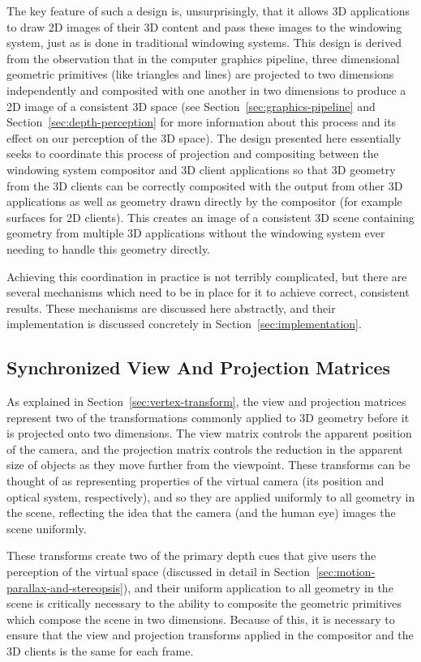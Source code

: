 The key feature of such a design is, unsurprisingly, that it allows 3D applications to draw 2D images of their 3D content and pass these images to the windowing system, just as is done in traditional windowing systems. This design is derived from the observation that in the computer graphics pipeline, three dimensional geometric primitives (like triangles and lines) are projected to two dimensions independently and composited with one another in two dimensions to produce a 2D image of a consistent 3D space (see Section~\ref{sec:graphics-pipeline} and Section~\ref{sec:depth-perception} for more information about this process and its effect on our perception of the 3D space). The design presented here essentially seeks to coordinate this process of projection and compositing between the windowing system compositor and 3D client applications so that 3D geometry from the 3D clients can be correctly composited with the output from other 3D applications as well as geometry drawn directly by the compositor (for example surfaces for 2D clients). This creates an image of a consistent 3D scene containing geometry from multiple 3D applications without the windowing system ever needing to handle this geometry directly.

Achieving this coordination in practice is not terribly complicated, but there are several mechanisms which need to be in place for it to achieve correct, consistent results. These mechanisms are discussed here abstractly, and their implementation is discussed concretely in Section~\ref{sec:implementation}.

\subsection{Synchronized View And Projection Matrices}
As explained in Section~\ref{sec:vertex-transform}, the view and projection matrices represent two of the transformations commonly applied to 3D geometry before it is projected onto two dimensions. The view matrix controls the apparent position of the camera, and the projection matrix controls the reduction in the apparent size of objects as they move further from the viewpoint. These transforms can be thought of as representing properties of the virtual camera (its position and optical system, respectively), and so they are applied uniformly to all geometry in the scene, reflecting the idea that the camera (and the human eye) images the scene uniformly. 

These transforms create two of the primary depth cues that give users the perception of the virtual space (discussed in detail in Section~\ref{sec:motion-parallax-and-stereopsis}), and their uniform application to all geometry in the scene is critically necessary to the ability to composite the geometric primitives which compose the scene in two dimensions. Because of this, it is necessary to ensure that the view and projection transforms applied in the compositor and the 3D clients is the same for each frame. 

